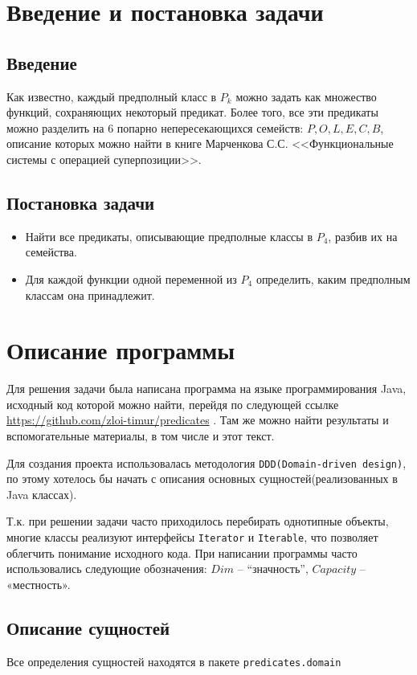 \documentclass[a4paper,14pt]{extreport}
\begin{document}
\newpage
\tableofcontents
\newpage
\chapter{ Введение и постановка задачи }

\section{Введение}
Как известно, каждый предполный класс в $P_k$ можно задать как множество функций, сохраняющих некоторый предикат. Более того, все эти предикаты можно разделить на 6 попарно непересекающихся семейств: $P, O, L, E, C, B$, описание которых можно найти в книге Марченкова С.С. <<Функциональные системы с операцией суперпозиции>>. 

\section{Постановка задачи}
\begin{itemize}
\item Найти все предикаты, описывающие предполные классы в $P_4$, разбив их на семейства.
\item Для каждой функции одной переменной из $P_4$ определить, каким предполным классам она принадлежит.
\end{itemize}
 

\chapter{Описание программы}
Для решения задачи была написана программа на языке программирования Java, исходный код которой можно найти, перейдя по следующей ссылке \url{https://github.com/zloi-timur/predicates} . Там же можно найти результаты и вспомогательные материалы, в том числе и этот текст.

Для создания проекта использовалась методология {\tt DDD(Domain-driven design)}, по этому хотелось бы начать с описания основных сущностей(реализованных в Java классах).

Т.к. при решении задачи часто приходилось перебирать однотипные объекты, многие классы реализуют интерфейсы {\tt Iterator} и {\tt Iterable}, что позволяет облегчить понимание исходного кода.
При написании программы часто использовались следующие обозначения: 
$Dim$ – “значность”, $Capacity$ – «местность».  

\section{Описание сущностей}
Все определения сущностей находятся в пакете {\tt predicates.domain}
\end{document}
